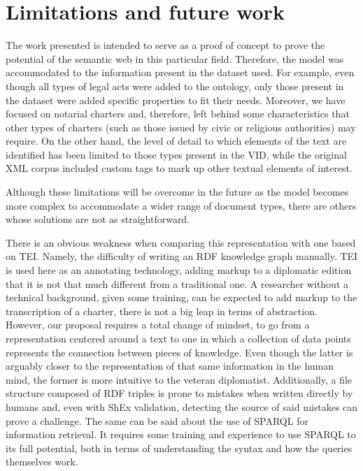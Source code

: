 \documentclass{article}
\begin{document}
\section{Limitations and future work}
\label{future}
The work presented is intended to serve as a proof of concept to prove the potential of the semantic web in this particular field.
Therefore, the model was accommodated to the information present in the dataset used.
For example, even though all types of legal acts were added to the ontology, only those present in the dataset were added specific properties to fit their needs.
Moreover, we have focused on notarial charters and, therefore, left behind some characteristics that other types of charters (such as those issued by civic or religious authorities) may require.
On the other hand, the level of detail to which elements of the text are identified has been limited to those types present in the VID, while the original XML corpus included custom tags to mark up other textual elements of interest.

Although these limitations will be overcome in the future as the model becomes more complex to accommodate a wider range of document types, there are others whose solutions are not as straightforward.

There is an obvious weakness when comparing this representation with one based on TEI.
Namely, the difficulty of writing an RDF knowledge graph manually.
TEI is used here as an annotating technology, adding markup to a diplomatic edition that it is not that much different from a traditional one.
A researcher without a technical background, given some training, can be expected to add markup to the transcription of a charter, there is not a big leap in terms of abstraction.
However, our proposal requires a total change of mindset, to go from a representation centered around a text to one in which a collection of data points represents the connection between pieces of knowledge.
Even though the latter is arguably closer to the representation of that same information in the human mind, the former is more intuitive to the veteran diplomatist.
Additionally, a file structure composed of RDF triples is prone to mistakes when written directly by humans and, even with ShEx validation, detecting the source of said mistakes can prove a challenge.
The same can be said about the use of SPARQL for information retrieval.
It requires some training and experience to use SPARQL to its full potential, both in terms of understanding the syntax and how the queries themselves work.
\end{document}
